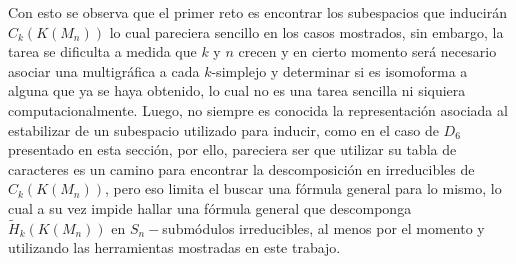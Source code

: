 \documentclass[12pt]{book}
\theoremstyle{definition}
\newcounter{in}
\begin{document}
Con esto se observa que el primer reto es encontrar los subespacios que inducirán $C_{k}(K(M_{n}))$ lo cual pareciera sencillo en los casos mostrados, sin embargo, la tarea se dificulta a medida que $k$ y $n$ crecen y en cierto momento será necesario asociar una multigráfica a cada $k$-simplejo y determinar si es isomoforma a alguna que ya se haya obtenido, lo cual no es una tarea sencilla ni siquiera computacionalmente. Luego, no siempre es conocida la representación asociada al estabilizar de un subespacio utilizado para inducir, como en el caso de $D_{6}$ presentado en esta sección, por ello, pareciera ser que utilizar su tabla de caracteres es un camino para encontrar la descomposición en irreducibles de $C_{k}(K(M_{n}))$, pero eso limita el buscar una fórmula general para lo mismo, lo cual a su vez impide hallar una fórmula general que descomponga $\widetilde H_{k}(K(M_{n}))$ en $S_{n}-$submódulos irreducibles, al menos por el momento y utilizando las herramientas mostradas en este trabajo.
%
\end{document}
